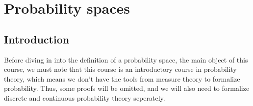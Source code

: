 \documentclass[11pt,a4paper]{article}
\begin{document}
\maketitle


\vspace{1in}
%
%
%

\newpage
\tableofcontents
\newpage

\section{Probability spaces}
\subsection{Introduction}
Before diving in into the definition of a probability space, the main object
of this course, we must note that this course is an introductory course in 
probability theory, which means we don't have the tools from measure theory
to formalize probability. Thus, some proofs will be omitted, and we will
also need to formalize discrete and continuous probability theory seperately.
\end{document}
